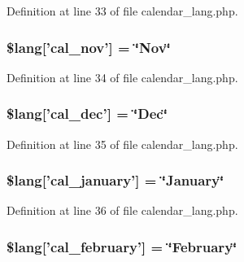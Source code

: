 Definition at line 33 of file calendar\-\_\-lang.\-php.

\hypertarget{calendar__lang_8php_a6c8f862507c12a677f22d9df6bf92515}{
\subsubsection[{\$lang}]{\setlength{\rightskip}{0pt plus 5cm}\$lang\mbox{[}'cal\-\_\-nov'\mbox{]} = \char`\"{}Nov\char`\"{}}}\label{calendar__lang_8php_a6c8f862507c12a677f22d9df6bf92515}


Definition at line 34 of file calendar\-\_\-lang.\-php.

\hypertarget{calendar__lang_8php_ab97feaeee2a9c0746ca0a3631c6f70db}{
\subsubsection[{\$lang}]{\setlength{\rightskip}{0pt plus 5cm}\$lang\mbox{[}'cal\-\_\-dec'\mbox{]} = \char`\"{}Dec\char`\"{}}}\label{calendar__lang_8php_ab97feaeee2a9c0746ca0a3631c6f70db}


Definition at line 35 of file calendar\-\_\-lang.\-php.

\hypertarget{calendar__lang_8php_a8b4025982a3bddb1a5cfd4c37dd5e859}{
\subsubsection[{\$lang}]{\setlength{\rightskip}{0pt plus 5cm}\$lang\mbox{[}'cal\-\_\-january'\mbox{]} = \char`\"{}January\char`\"{}}}\label{calendar__lang_8php_a8b4025982a3bddb1a5cfd4c37dd5e859}


Definition at line 36 of file calendar\-\_\-lang.\-php.

\hypertarget{calendar__lang_8php_a32a50b63add7abc253c9bc36f4fa6f72}{
\subsubsection[{\$lang}]{\setlength{\rightskip}{0pt plus 5cm}\$lang\mbox{[}'cal\-\_\-february'\mbox{]} = \char`\"{}February\char`\"{}}}\label{calendar__lang_8php_a32a50b63add7abc253c9bc36f4fa6f72}


